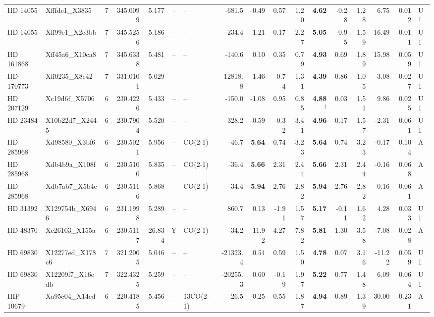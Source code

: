 \begin{tabular}{@{}l@{~}l@{~}c@{~}r@{~}r@{~}c@{~}l@{~}r@{~~}r@{~}r@{~}r@{~~}r@{~}r@{~}r@{~~}r@{~}r@{~}l@{}}
HD 14055 & Xfffde1\_X3835 & 7 & 345.0099 & 5.177 & -- & -- & -681.5 & -0.49 & 0.57 & 1.20 & \textbf{4.62} & -0.28 & 1.28 & 6.75 & 0.012 & U1 \\
HD 14055 & Xff99e1\_X2c3bb & 7 & 345.5256 & 5.186 & -- & -- & -234.4 & 1.21 & 0.17 & 2.27 & \textbf{5.05} & -0.95 & 1.59 & 16.49 & 0.011 & U1 \\
HD 161868 & Xff45a6\_X10ca8 & 7 & 345.6338 & 5.481 & -- & -- & -140.6 & 0.10 & 0.35 & 0.79 & \textbf{4.93} & 0.69 & 1.89 & 15.98 & 0.059 & U1 \\
HD 170773 & Xff0235\_X8c42 & 7 & 331.0101 & 5.029 & -- & -- & -12818.8 & -1.46 & -0.74 & 1.31 & \textbf{4.39} & 0.86 & 1.05 & 3.08 & 0.027 & U1 \\
HD 207129 & Xc19d6f\_X5706 & 6 & 230.4226 & 5.433 & -- & -- & -150.0 & -1.08 & 0.95 & 0.85 & \textbf{4.88}$^{\dagger}$ & 0.03 & 1.51 & 9.86 & 0.025 & U1 \\
HD 23484 & X10b22d7\_X2445 & 6 & 230.7904 & 5.520 & -- & -- & 328.2 & -0.59 & -0.32 & 3.41 & \textbf{4.96} & 0.17 & 1.57 & -2.31 & 0.061 & U1 \\
HD 285968 & Xd98580\_X3bf6 & 6 & 230.5021 & 5.956 & -- & CO(2-1) & -46.7 & \textbf{5.64} & 0.74 & 3.23 & \textbf{5.64} & 0.74 & 3.23 & -0.17 & 0.104 & A \\
HD 285968 & Xdb4b9a\_X108f & 6 & 230.5100 & 5.835 & -- & CO(2-1) & -36.4 & \textbf{5.66} & 2.31 & 2.44 & \textbf{5.66} & 2.31 & 2.44 & -0.16 & 0.068 & A \\
HD 285968 & Xdb7ab7\_X5b4e & 6 & 230.5116 & 5.868 & -- & CO(2-1) & -34.4 & \textbf{5.94} & 2.76 & 2.82 & \textbf{5.94} & 2.76 & 2.82 & -0.16 & 0.061 & A \\
HD 31392 & X129754b\_X6946 & 6 & 231.1998 & 5.289 & -- & -- & 860.7 & 0.13 & -1.91 & 1.57 & \textbf{5.17} & -0.11 & 1.62 & 4.28 & 0.033 & U1 \\
HD 48370 & Xc26103\_X155a & 6 & 230.5117 & 26.834 & Y & CO(2-1) & -34.2 & 11.92 & 4.27 & 7.82 & \textbf{5.81} & 1.30 & 3.58 & -7.08 & 0.028 & A \\
HD 69830 & X12277ed\_X178c6 & 7 & 321.2005 & 5.046 & -- & -- & -21323.4 & 0.54 & 0.59 & 1.50 & \textbf{4.78} & 0.07 & 3.16 & -11.22 & 0.059 & U1 \\
HD 69830 & X12209f7\_X16edb & 7 & 322.4325 & 5.259 & -- & -- & -20255.3 & 0.60 & -0.19 & 1.97 & \textbf{5.22} & 0.77 & 1.48 & 6.09 & 0.064 & U1 \\
HIP 10679 & Xa95c04\_X14cd & 6 & 220.4185 & 5.456 & -- & 13CO(2-1) & 26.5 & -0.25 & 0.55 & 1.87 & \textbf{4.94} & 0.89 & 1.39 & 30.00 & 0.231 & A \\

\end{tabular}
